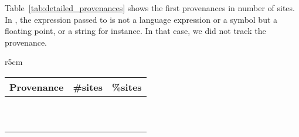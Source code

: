 \documentclass[screen,acmsmall]{acmart}
\begin{document}
 Table~\ref{tab:detailed_provenances} shows the first provenances in number of sites. In \packagePercentProvenanceSitesd, the expression passed to \eval is not a language expression or a symbol but a floating point, or a string for instance. In that case, we did not track the provenance.
\begin{wraptable}{r}{5cm}\small\centering
	\begin{tabular}{|c|c|c|}
		\hline
		Provenance & \#sites & \%sites \\
		\hline
		\packageProvenanceNamea & \packageNbProvenanceSitesa & \packagePercentProvenanceSitesa \\
		\packageProvenanceNameb & \packageNbProvenanceSitesb & \packagePercentProvenanceSitesb \\
		\packageProvenanceNamec & \packageNbProvenanceSitesc & \packagePercentProvenanceSitesc \\
		\packageProvenanceNamee & \packageNbProvenanceSitese & \packagePercentProvenanceSitese \\
		\packageProvenanceNamef & \packageNbProvenanceSitesf & \packagePercentProvenanceSitesf \\
		\packageProvenanceNameg & \packageNbProvenanceSitesg & \packagePercentProvenanceSitesg \\
		\packageProvenanceNameh & \packageNbProvenanceSitesh & \packagePercentProvenanceSitesh \\
		\packageProvenanceNamei & \packageNbProvenanceSitesi & \packagePercentProvenanceSitesi \\
		\packageProvenanceNamel & \packageNbProvenanceSitesl & \packagePercentProvenanceSitesl \\
		\packageProvenanceNamen & \packageNbProvenanceSitesn & \packagePercentProvenanceSitesn \\
		\hline
	\end{tabular}
	\caption{Provenances in number of sites.} \label{tab:detailed_provenances}
\end{wraptable}
\end{document}
